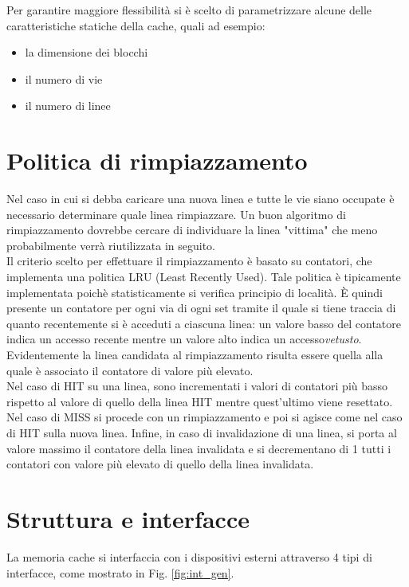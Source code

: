 Per garantire maggiore flessibilit\`a si \`e scelto di parametrizzare alcune delle caratteristiche statiche della cache, quali ad esempio:
\begin{itemize}
\item la dimensione dei blocchi
\item il numero di vie
\item il numero di linee
\end{itemize}


\section{Politica di rimpiazzamento}

Nel caso in cui si debba caricare una nuova linea e tutte le vie siano occupate \`e necessario determinare quale linea rimpiazzare.
Un buon algoritmo di rimpiazzamento dovrebbe cercare di individuare la linea "vittima" che meno probabilmente verr\`a riutilizzata in seguito.\\
Il criterio scelto per effettuare il rimpiazzamento \`e basato su contatori, che implementa una politica LRU (Least Recently Used).
Tale politica \`e tipicamente implementata poich\`e statisticamente si verifica principio di localit\`a.
\`E quindi presente un contatore per ogni via di ogni set tramite il quale si tiene traccia di quanto recentemente si \`e acceduti a ciascuna linea: un valore basso del contatore indica un accesso recente mentre un valore alto indica un accesso\emph{vetusto}.
Evidentemente la linea candidata al rimpiazzamento risulta essere quella alla quale \`e associato il contatore di valore pi\`u elevato.\\
Nel caso di HIT su una linea, sono incrementati i valori di contatori pi\`u basso rispetto al valore di quello della linea HIT mentre quest'ultimo viene resettato.
Nel caso di MISS si procede con un rimpiazzamento e poi si agisce come nel caso di HIT sulla nuova linea.
Infine, in caso di invalidazione di una linea, si porta al valore massimo il contatore della linea invalidata e si decrementano di 1 tutti i contatori con valore pi\`u elevato di quello della linea invalidata.


\section{Struttura e interfacce}
La memoria cache si interfaccia con i dispositivi esterni attraverso 4 tipi di interfacce, come mostrato in Fig. \ref{fig:int_gen}.\\

